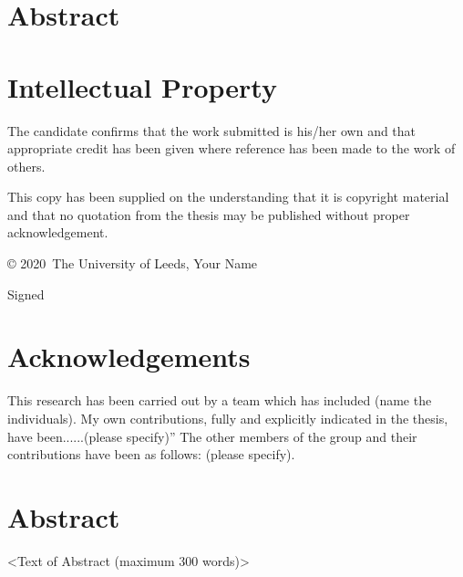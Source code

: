 \documentclass[11pt]{report}
\newcommand{\name}{Your Name}
\newcommand{\submissionyear}{2020}
\begin{document}
\maketitle

\chapter*{Abstract}
\blindtext[1] %

\chapter*{Intellectual Property}
The candidate confirms that the work submitted is his/her own and that appropriate credit has been given where reference has been made to the work of others.

This copy has been supplied on the understanding that it is copyright material and that no quotation from the thesis may be published without proper acknowledgement.

© \submissionyear\ The University of Leeds, \name

\vspace{2cm}
Signed 

\chapter*{Acknowledgements}
This research has been carried out by a team which has included (name the individuals). My own contributions, fully and explicitly indicated in the thesis, have been......(please specify)” The other members of the group and their contributions have been as follows: (please specify).

\chapter*{Abstract}
<Text of Abstract  (maximum 300 words)>

\tableofcontents
\listoffigures
\listoftables

\newpage
\setcounter{page}{0}

 

\renewcommand\bibname{References}
\printbibliography


\end{document}
